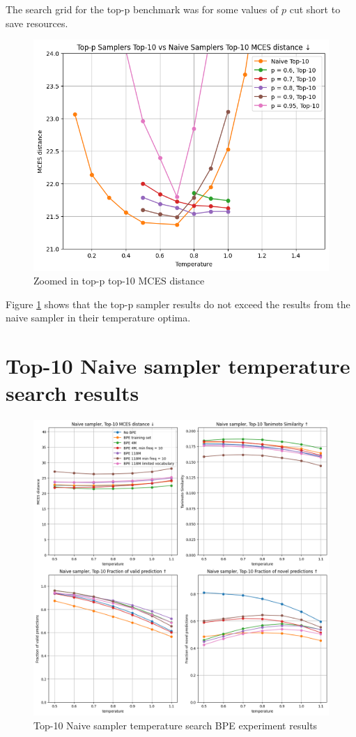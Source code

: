 The search grid for the top-p benchmark was for some values of $p$ cut short to save resources.

\begin{figure}[h]
    \centering
    \includegraphics[width=0.6\linewidth]{figures/appendix/samplers/top-p_vs_naive_top-10.png}
    \caption{Zoomed in top-p top-10 MCES distance}
    \label{fig:top-p_zoomed_appendix}
\end{figure}

Figure \ref{fig:top-p_zoomed_appendix} shows that the top-p sampler results do not exceed the results from the naive sampler in their temperature optima.


\section{Top-10 Naive sampler temperature search results}
\label{sec:temp_search_appendix}

\begin{figure}[h]
    \centering
    \includegraphics[width=1.0\textwidth]{figures/appendix/bpe_with_tanimoto.png}
    \caption{Top-10 Naive sampler temperature search BPE experiment results}
    \label{fig:bpe_appendix}
\end{figure}

